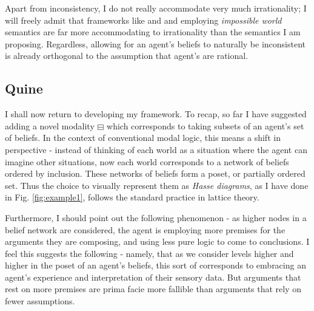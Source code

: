 \documentclass[11pt]{article}
\numberwithin{equation}{subsection}
\newcommand{\BM}{\boxminus}
\begin{document}
Apart from inconsistency, I do not really accommodate very much
irrationality; I will freely admit that frameworks like
\citep{rantala_impossible_1982} and and \citet{levesque_logic_1984}
employing \emph{impossible world} semantics are far more accommodating
to irrationality than the semantics I am proposing.  Regardless,
allowing for an agent's beliefs to
naturally be inconsistent is already orthogonal to the assumption that
agent's are rational.

\subsection{Quine}\label{quine}
I shall now return to developing my framework.  To recap, so far I
have suggested adding a novel modality $\BM$ which corresponds to
taking subsets of an agent's set of beliefs.  In the context of
conventional modal logic, this means a shift in perspective - instead
of thinking of each world as a situation where the agent can imagine
other situations, now each world corresponds to a network of beliefs
ordered by inclusion. These networks of beliefs form a poset, or
partially ordered set.  Thus the choice to visually represent them as
\emph{Hasse diagrams}, as I have done in Fig. \ref{fig:example1}, 
follows the standard practice in lattice theory. 

Furthermore, I should point out the following phenomenon - as higher
nodes in a belief network are considered, the agent is employing more
premises for the arguments they are composing, and using less pure
logic to come to conclusions.  I feel this suggests the following -
namely, that as we consider levels higher and higher in the poset of
an agent's beliefs, this sort of corresponds to embracing an agent's
experience and interpretation of their sensory data.  But arguments
that rest on more premises are prima facie more fallible than
arguments that rely on fewer assumptions.
\end{document}
